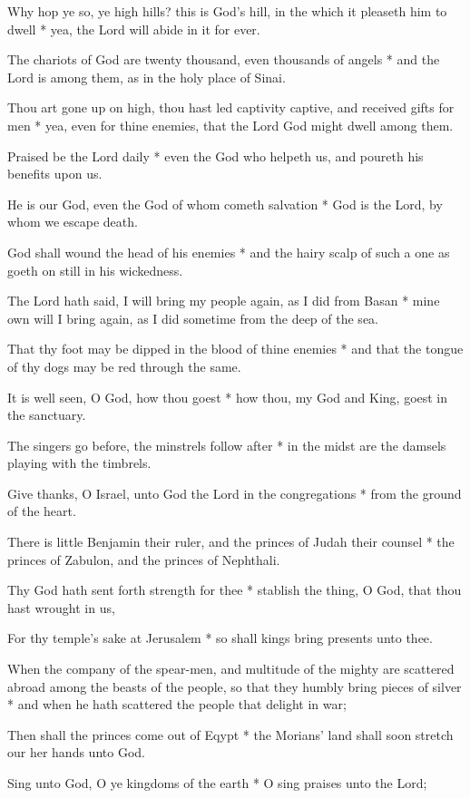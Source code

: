 Why hop ye so, ye high hills? this is God's hill, in the which it pleaseth him to dwell * yea, the Lord will abide in it for ever.

The chariots of God are twenty thousand, even thousands of angels * and the Lord is among them, as in the holy place of Sinai.

Thou art gone up on high, thou hast led captivity captive, and received gifts for men * yea, even for thine enemies, that the Lord God might dwell among them.

Praised be the Lord daily * even the God who helpeth us, and poureth his benefits upon us.

He is our God, even the God of whom cometh salvation * God is the Lord, by whom we escape death.

God shall wound the head of his enemies * and the hairy scalp of such a one as goeth on still in his wickedness.

The Lord hath said, I will bring my people again, as I did from Basan * mine own will I bring again, as I did sometime from the deep of the sea.

That thy foot may be dipped in the blood of thine enemies * and that the tongue of thy dogs may be red through the same.

It is well seen, O God, how thou goest * how thou, my God and King, goest in the sanctuary.

The singers go before, the minstrels follow after * in the midst are the damsels playing with the timbrels.

Give thanks, O Israel, unto God the Lord in the congregations * from the ground of the heart.

There is little Benjamin their ruler, and the princes of Judah their counsel * the princes of Zabulon, and the princes of Nephthali.

Thy God hath sent forth strength for thee * stablish the thing, O God, that thou hast wrought in us,

For thy temple's sake at Jerusalem * so shall kings bring presents unto thee.

When the company of the spear-men, and multitude of the mighty are scattered abroad among the beasts of the people, so that they humbly bring pieces of silver * and when he hath scattered the people that delight in war;

Then shall the princes come out of Eqypt * the Morians' land shall soon stretch our her hands unto God.

Sing unto God, O ye kingdoms of the earth * O sing praises unto the Lord;

